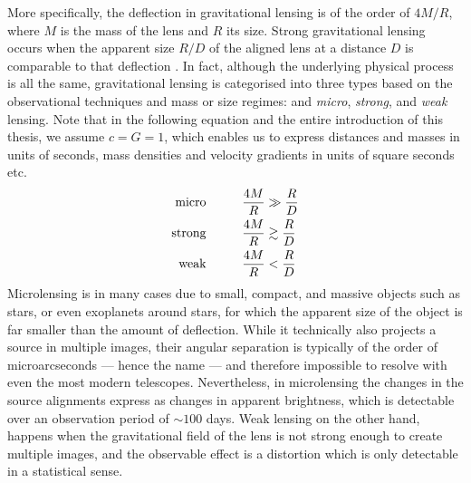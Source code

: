 More specifically, the deflection in gravitational lensing is of the order of
$4M/R$, where $M$ is the mass of the lens and $R$ its size.  Strong
gravitational lensing occurs when the apparent size $R/D$ of the aligned lens at
a distance $D$ is comparable to that deflection .  In fact,
although the underlying physical process is all the same, gravitational lensing
is categorised into three types based on the observational techniques and mass
or size regimes: and \textit{micro}, \textit{strong}, and \textit{weak} lensing.
Note that in the following equation and the entire introduction of this thesis,
we assume $c=G=1$, which enables us to express distances and masses in units of
seconds, mass densities and velocity gradients in units of square seconds etc.
%
\begin{equation}\eqlbl{lensing_types}%
  \begin{aligned}
    \text{micro} \hspace{1cm}&\frac{4M}{R} \gg \frac{R}{D}\\
    \text{strong} \hspace{1cm}&\frac{4M}{R} \gtrsim \frac{R}{D}\\
    \text{weak} \hspace{1cm}&\frac{4M}{R} < \frac{R}{D}
  \end{aligned}
\end{equation}%
%
Microlensing is in many cases due to small, compact, and massive
objects such as stars, or even exoplanets around stars, for which the
apparent size of the object is far smaller than the amount of
deflection.  While it technically also projects a source in multiple
images, their angular separation is typically of the order of
microarcseconds --- hence the name --- and therefore impossible to resolve
with even the most modern telescopes. Nevertheless, in microlensing
the changes in the source alignments express as changes in apparent
brightness, which is detectable over an observation period of
$\sim100$ days.  Weak lensing on the other hand, happens when the
gravitational field of the lens is not strong enough to create
multiple images, and the observable effect is a distortion which is
only detectable in a statistical sense.

